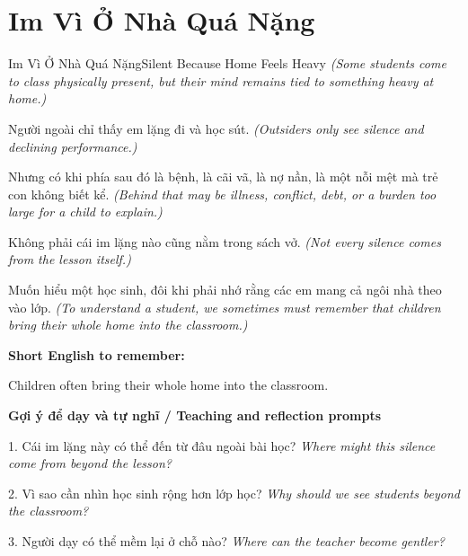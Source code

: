 \section{Im Vì Ở Nhà Quá Nặng}
\begin{truyen}{Im Vì Ở Nhà Quá Nặng}{Silent Because Home Feels Heavy}
\textit{(Some students come to class physically present, but their mind remains tied to something heavy at home.)}

Người ngoài chỉ thấy em lặng đi và học sút.
\textit{(Outsiders only see silence and declining performance.)}

Nhưng có khi phía sau đó là bệnh, là cãi vã, là nợ nần, là một nỗi mệt mà trẻ con không biết kể.
\textit{(Behind that may be illness, conflict, debt, or a burden too large for a child to explain.)}

Không phải cái im lặng nào cũng nằm trong sách vở.
\textit{(Not every silence comes from the lesson itself.)}

\end{truyen}

\begin{baihoc}
Muốn hiểu một học sinh, đôi khi phải nhớ rằng các em mang cả ngôi nhà theo vào lớp.
\textit{(To understand a student, we sometimes must remember that children bring their whole home into the classroom.)}
\end{baihoc}

\begin{ghinhoanh}
\textbf{Short English to remember:}

Children often bring their whole home into the classroom.

\end{ghinhoanh}

\begin{tuhocnhanh}
\textbf{Gợi ý để dạy và tự nghĩ / Teaching and reflection prompts}

1. Cái im lặng này có thể đến từ đâu ngoài bài học? \textit{Where might this silence come from beyond the lesson?}

2. Vì sao cần nhìn học sinh rộng hơn lớp học? \textit{Why should we see students beyond the classroom?}

3. Người dạy có thể mềm lại ở chỗ nào? \textit{Where can the teacher become gentler?}
\end{tuhocnhanh}
\ngancach

